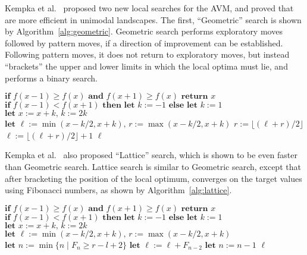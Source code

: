 \documentclass{llncs}
\newcommand{\inlineheading}[1]{\vspace{1ex} \noindent {\bf #1.}}
\begin{document}
\inlineheading{Algorithms}
Kempka et al.~\cite{Kempka2015} proposed two new local searches for the AVM, and proved that are more efficient in unimodal landscapes. The first, ``Geometric'' search is shown by Algorithm~\ref{alg:geometric}. Geometric search performs exploratory moves followed by pattern moves, if a direction of improvement can be established. Following pattern moves, it does not return to exploratory moves, but instead ``brackets'' the upper and lower limits in which the local optima must lie, and performs a binary search.

\begin{algorithm}
	\small
	\caption{$\text{Geometric search, starting at }x\in D$}
	\begin{algorithmic}[1]
		\STATE$\textbf{if }f(x-1)\geq f(x)\textbf{ and }f(x+1)\geq f(x)\textbf{ return }x$
		\STATE$\textbf{if }f(x-1)<f(x+1)\textbf{ then let }k:=-1\textbf{ else let }k:=1$
			\STATE$\textbf{let }x:=x+k\text{, }k:=2k$
		\ENDWHILE
		\STATE$\textbf{let }\ell:=\min(x-k/2,x+k)\text{, }r:=\max(x-k/2,x+k)$
				\STATE$r:=\lfloor(\ell+r)/2\rfloor$
			\ELSE
				\STATE$\ell:=\lfloor(\ell+r)/2\rfloor+1$
			\ENDIF
		\ENDWHILE
		\RETURN$\ell$
	\end{algorithmic}
	\vspace*{1mm}
	\label{alg:geometric}
\end{algorithm}

Kempka et al.~\cite{Kempka2015} also proposed ``Lattice'' search, which is shown to be even faster than Geometric search. Lattice search is similar to Geometric search, except that after bracketing the position of the local optimum, converges on the target values using Fibonacci numbers, as shown by Algorithm~\ref{alg:lattice}.

\begin{algorithm}
	\small
	\caption{$\text{Lattice search, starting at }x\in D$}
	\begin{algorithmic}[1]
		\STATE$\textbf{if }f(x-1)\geq f(x)\textbf{ and }f(x+1)\geq f(x)\textbf{ return }x$
		\STATE$\textbf{if }f(x-1)<f(x+1)\textbf{ then let }k:=-1\textbf{ else let }k:=1$
			\STATE$\textbf{let }x:=x+k\text{, }k:=2k$
		\ENDWHILE
		\STATE$\textbf{let }\ell:=\min(x-k/2,x+k)\text{, }r:=\max(x-k/2,x+k)$
		\STATE$\textbf{let }n:=\min\{n\mid F_{n}\geq r-l+2\}$
				\STATE$\textbf{let }\ell:=\ell+F_{n-2}$
			\ENDIF
			\STATE$\textbf{let }n:=n-1$
		\ENDWHILE
		\RETURN$\ell$
	\end{algorithmic}
	\vspace*{1mm}
	\label{alg:lattice}
\end{algorithm}
\end{document}
